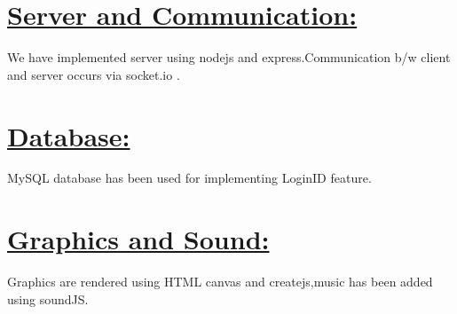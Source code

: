 \documentclass[14pt]{extarticle}
\begin{document}
\section{\underline{Server and Communication:}}
We have implemented server using nodejs and express.Communication b/w client and server occurs via socket.io .
\section{\underline{Database:}}
MySQL database has been used for implementing LoginID feature.
\
\section{\underline{Graphics and Sound:}}
Graphics are rendered using HTML canvas and createjs,music has been added using soundJS.
\end{document}
